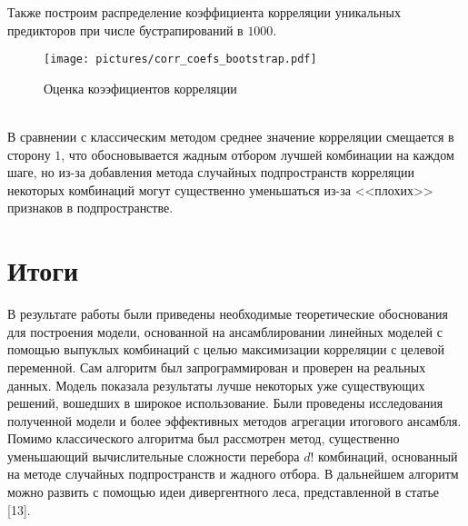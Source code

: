 \documentclass{article}
\begin{document}
\newpage
Также построим распределение коэффициента корреляции уникальных предикторов при числе бустрапирований в $1000$.
\begin{figure}[!htb]
    \centering
    \texttt{[image: pictures/corr\_coefs\_bootstrap.pdf]}
    \caption{Оценка коээфициентов корреляции}
\end{figure}\\
В сравнении с классическим методом среднее значение корреляции смещается в сторону $1$, что обосновывается жадным отбором лучшей комбинации на каждом шаге, но из-за добавления метода случайных подпространств корреляции некоторых комбинаций могут существенно уменьшаться из-за  <<плохих>> признаков в подпространстве. 
\section{Итоги}
В результате работы были приведены необходимые теоретические обоснования для построения модели, основанной на ансамблировании линейных моделей с помощью выпуклых комбинаций с целью максимизации корреляции с целевой переменной. Сам алгоритм был запрограммирован и проверен на реальных данных. Модель показала результаты лучше некоторых уже существующих решений, вошедших в широкое использование. Были проведены исследования полученной модели и более эффективных методов агрегации итогового ансамбля. Помимо классического алгоритма был рассмотрен метод, существенно уменьшающий вычислительные сложности перебора $d!$ комбинаций, основанный на методе случайных подпространств и жадного отбора. В дальнейшем алгоритм можно развить с помощью идеи дивергентного леса, представленной в статье [13].  
\newpage 
\newpage 
\end{document}
